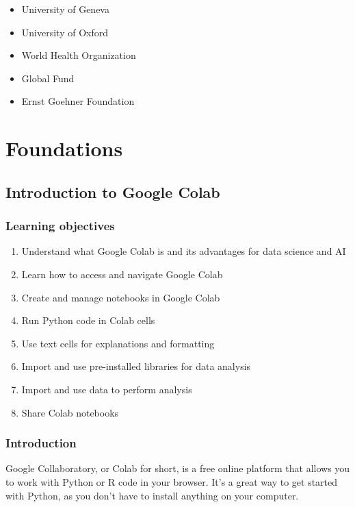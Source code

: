 \documentclass[
  letterpaper,
  DIV=11,
  numbers=noendperiod]{scrreprt}
\providecommand{\tightlist}{%
  \setlength{\itemsep}{0pt}\setlength{\parskip}{0pt}}\usepackage{longtable,booktabs,array}
\begin{document}

\begin{itemize}
\tightlist
\item
  University of Geneva
\item
  University of Oxford
\item
  World Health Organization
\item
  Global Fund
\item
  Ernst Goehner Foundation
\end{itemize}

\part{Foundations}

\chapter{Introduction to Google
Colab}\label{introduction-to-google-colab}

\section{Learning objectives}\label{learning-objectives}

\begin{enumerate}
\def\labelenumi{\arabic{enumi}.}
\tightlist
\item
  Understand what Google Colab is and its advantages for data science
  and AI
\item
  Learn how to access and navigate Google Colab
\item
  Create and manage notebooks in Google Colab
\item
  Run Python code in Colab cells
\item
  Use text cells for explanations and formatting
\item
  Import and use pre-installed libraries for data analysis
\item
  Import and use data to perform analysis
\item
  Share Colab notebooks
\end{enumerate}

\section{Introduction}\label{introduction-1}

Google Collaboratory, or Colab for short, is a free online platform that
allows you to work with Python or R code in your browser. It's a great
way to get started with Python, as you don't have to install anything on
your computer.
\end{document}
